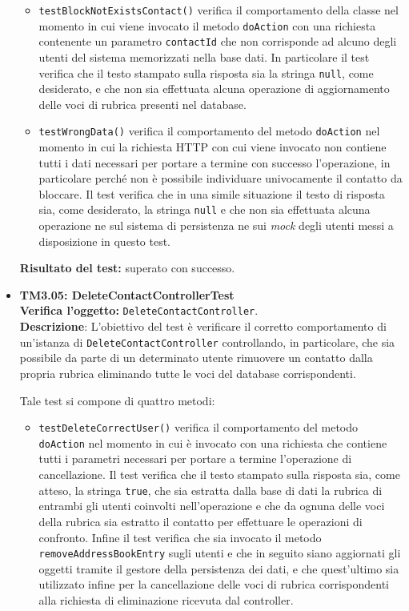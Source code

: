 \begin{itemize}
\begin{itemize}
\item \texttt{testBlockNotExistsContact()} verifica il comportamento della classe nel momento in cui viene invocato il metodo \texttt{doAction} con una richiesta contenente un parametro \texttt{contactId} che non corrisponde ad alcuno degli utenti del sistema memorizzati nella base dati. In particolare il test verifica che il testo stampato sulla risposta sia la stringa \texttt{null}, come desiderato, e che non sia effettuata alcuna operazione di aggiornamento delle voci di rubrica presenti nel database.

\item \texttt{testWrongData()} verifica il comportamento del metodo \texttt{doAction} nel momento in cui la richiesta HTTP con cui viene invocato non contiene tutti i dati necessari per portare a termine con successo l'operazione, in particolare perché non è possibile individuare univocamente il contatto da bloccare. Il test verifica che in una simile situazione il testo di risposta sia, come desiderato, la stringa \texttt{null} e che non sia effettuata alcuna operazione ne sul sistema di persistenza ne sui \textit{mock} degli utenti messi a disposizione in questo test.
\end{itemize}
\textbf{Risultato del test:} superato con successo.

\item \textbf{TM3.05: DeleteContactControllerTest}\\
\textbf{Verifica l'oggetto:} \texttt{DeleteContactController}.\\
\textbf{Descrizione}: L'obiettivo del test è verificare il corretto comportamento di un'istanza di \texttt{DeleteContactController} controllando, in particolare, che sia possibile da parte di un determinato utente rimuovere un contatto dalla propria rubrica eliminando tutte le voci del database corrispondenti.

Tale test si compone di quattro metodi:
\begin{itemize}
\item \texttt{testDeleteCorrectUser()} verifica il comportamento del metodo \texttt{doAction} nel momento in cui è invocato con una richiesta che contiene tutti i parametri necessari per portare a termine l'operazione di cancellazione. Il test verifica che il testo stampato sulla risposta sia, come atteso, la stringa \texttt{true}, che sia estratta dalla base di dati la rubrica di entrambi gli utenti coinvolti nell'operazione e che da ognuna delle voci della rubrica sia estratto il contatto per effettuare le operazioni di confronto. Infine il test verifica che sia invocato il metodo \texttt{removeAddressBookEntry} sugli utenti e che in seguito siano aggiornati gli oggetti tramite il gestore della persistenza dei dati, e che quest'ultimo sia utilizzato infine per la cancellazione delle voci di rubrica corrispondenti alla richiesta di eliminazione ricevuta dal controller.


\end{itemize}
\end{itemize}
